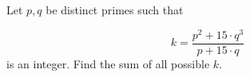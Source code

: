 Let $p,q$ be distinct primes such that

$$k=\dfrac{p^2+15\cdot q^3}{p+15\cdot q}$$is an integer. Find the sum of all possible $k$.
